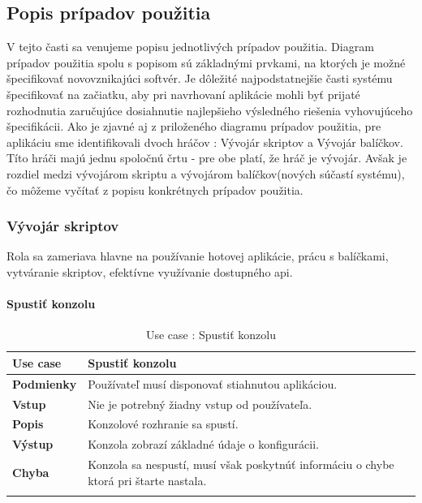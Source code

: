 \subsection{Popis prípadov použitia}
\indent V tejto časti sa venujeme popisu jednotlivých prípadov použitia. Diagram prípadov použitia spolu s popisom sú základnými prvkami, na ktorých je možné špecifikovať novovznikajúci softvér. Je dôležité najpodstatnejšie časti systému špecifikovať na začiatku, aby pri navrhovaní aplikácie mohli byť prijaté rozhodnutia zaručujúce dosiahnutie najlepšieho výsledného riešenia vyhovujúceho špecifikácii. Ako je zjavné aj z priloženého diagramu prípadov použitia, pre aplikáciu sme identifikovali dvoch hráčov : Vývojár skriptov a Vývojár balíčkov. Títo hráči majú jednu spoločnú črtu - pre obe platí, že hráč je vývojár. Avšak je rozdiel medzi vývojárom skriptu a vývojárom balíčkov(nových súčastí systému), čo môžeme vyčítať z popisu konkrétnych prípadov použitia.
\subsubsection{Vývojár skriptov}
\indent Rola sa zameriava hlavne na používanie hotovej aplikácie, prácu s balíčkami, vytváranie skriptov, efektívne využívanie dostupného \acrshort{api}. 
\paragraph{Spustiť konzolu}
\begin{center}
	\begin{longtable}{|p{2.5cm}|p{12.2cm}|}
		\hline
		\textbf{Use case} & Spustiť konzolu \\ 
		\hline
		\textbf{Podmienky} & Používateľ musí disponovať stiahnutou aplikáciou.\\
		\hline
		\textbf{Vstup} & Nie je potrebný žiadny vstup od používateľa.\\
		\hline
		\textbf{Popis} & Konzolové rozhranie sa spustí. \\ 
		\hline
		\textbf{Výstup} & Konzola zobrazí základné údaje o konfigurácii.\\
		\hline
		\textbf{Chyba} & Konzola sa nespustí, musí však poskytnúť informáciu o chybe ktorá pri štarte nastala.\\
		\hline
	\caption{Use case : Spustiť konzolu}
	\label{table:1}
	\end{longtable}
\end{center}

